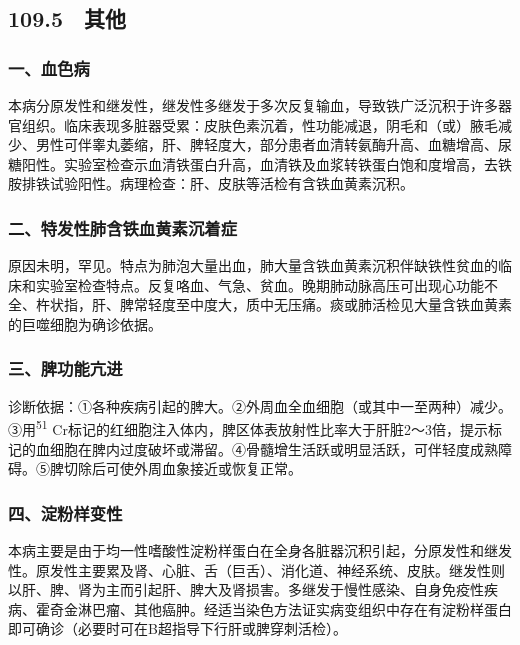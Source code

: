 \protect\hypertarget{text00250.html}{}{}

\subsection{109.5　其他}

\subsubsection{一、血色病}

本病分原发性和继发性，继发性多继发于多次反复输血，导致铁广泛沉积于许多器官组织。临床表现多脏器受累：皮肤色素沉着，性功能减退，阴毛和（或）腋毛减少、男性可伴睾丸萎缩，肝、脾轻度大，部分患者血清转氨酶升高、血糖增高、尿糖阳性。实验室检查示血清铁蛋白升高，血清铁及血浆转铁蛋白饱和度增高，去铁胺排铁试验阳性。病理检查：肝、皮肤等活检有含铁血黄素沉积。

\subsubsection{二、特发性肺含铁血黄素沉着症}

原因未明，罕见。特点为肺泡大量出血，肺大量含铁血黄素沉积伴缺铁性贫血的临床和实验室检查特点。反复咯血、气急、贫血。晚期肺动脉高压可出现心功能不全、杵状指，肝、脾常轻度至中度大，质中无压痛。痰或肺活检见大量含铁血黄素的巨噬细胞为确诊依据。

\subsubsection{三、脾功能亢进}

诊断依据：①各种疾病引起的脾大。②外周血全血细胞（或其中一至两种）减少。③用\textsuperscript{51}
Cr标记的红细胞注入体内，脾区体表放射性比率大于肝脏2～3倍，提示标记的血细胞在脾内过度破坏或滞留。④骨髓增生活跃或明显活跃，可伴轻度成熟障碍。⑤脾切除后可使外周血象接近或恢复正常。

\subsubsection{四、淀粉样变性}

本病主要是由于均一性嗜酸性淀粉样蛋白在全身各脏器沉积引起，分原发性和继发性。原发性主要累及肾、心脏、舌（巨舌）、消化道、神经系统、皮肤。继发性则以肝、脾、肾为主而引起肝、脾大及肾损害。多继发于慢性感染、自身免疫性疾病、霍奇金淋巴瘤、其他癌肿。经适当染色方法证实病变组织中存在有淀粉样蛋白即可确诊（必要时可在B超指导下行肝或脾穿刺活检）。

